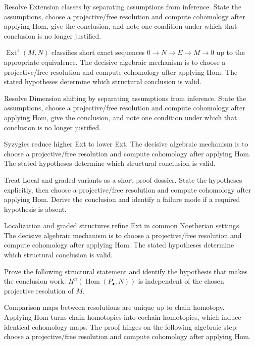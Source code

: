 \begin{problem}\label{prob:v27-problem-06}
Resolve Extension classes by separating assumptions from inference. State the assumptions, choose a projective/free resolution and compute cohomology after applying Hom, give the conclusion, and note one condition under which that conclusion is no longer justified.
\end{problem}
\begin{solution}
$\operatorname{Ext}^1(M,N)$ classifies short exact sequences $0\to N\to E\to M\to0$ up to the appropriate equivalence. The decisive algebraic mechanism is to choose a projective/free resolution and compute cohomology after applying Hom. The stated hypotheses determine which structural conclusion is valid.
\end{solution}

\begin{problem}\label{prob:v27-problem-07}
Resolve Dimension shifting by separating assumptions from inference. State the assumptions, choose a projective/free resolution and compute cohomology after applying Hom, give the conclusion, and note one condition under which that conclusion is no longer justified.
\end{problem}
\begin{solution}
Syzygies reduce higher Ext to lower Ext. The decisive algebraic mechanism is to choose a projective/free resolution and compute cohomology after applying Hom. The stated hypotheses determine which structural conclusion is valid.
\end{solution}

\begin{problem}\label{prob:v27-problem-08}
Treat Local and graded variants as a short proof dossier. State the hypotheses explicitly, then choose a projective/free resolution and compute cohomology after applying Hom. Derive the conclusion and identify a failure mode if a required hypothesis is absent.
\end{problem}
\begin{solution}
Localization and graded structures refine Ext in common Noetherian settings. The decisive algebraic mechanism is to choose a projective/free resolution and compute cohomology after applying Hom. The stated hypotheses determine which structural conclusion is valid.
\end{solution}

\begin{problem}\label{prob:v27-problem-09}
Prove the following structural statement and identify the hypothesis that makes the conclusion work: $H^n(\operatorname{Hom}(P_\bullet,N))$ is independent of the chosen projective resolution of $M$.
\end{problem}
\begin{solution}
Comparison maps between resolutions are unique up to chain homotopy. Applying Hom turns chain homotopies into cochain homotopies, which induce identical cohomology maps. The proof hinges on the following algebraic step: choose a projective/free resolution and compute cohomology after applying Hom.
\end{solution}

